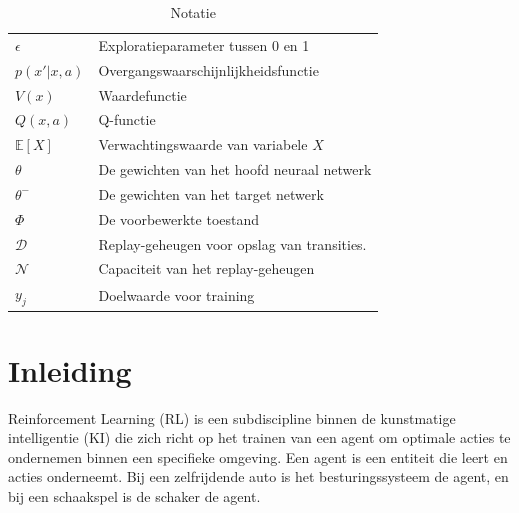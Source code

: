 \documentclass[a4paper,12pt]{report}
\begin{document}
\begin{table}[h]
\begin{tabular}{>{\raggedright}p{2.5cm} >{\raggedright\arraybackslash}p{10cm}}
        $\epsilon$               & Exploratieparameter tussen 0 en 1           \\
        $p(x'|x, a)$             & Overgangswaarschijnlijkheidsfunctie         \\
        $V(x)$                   & Waardefunctie                               \\
        $Q(x, a)$                & Q-functie                                   \\
        $\mathbb{E}[X]$          & Verwachtingswaarde van variabele $X$        \\
        $\theta$                 & De gewichten van het hoofd neuraal netwerk  \\
        $\theta^-$               & De gewichten van het target netwerk         \\
        $\Phi$                   & De voorbewerkte toestand                    \\
        $\mathcal{D}$            & Replay-geheugen voor opslag van transities. \\
        $\mathcal{N}$            & Capaciteit van het replay-geheugen          \\
        $y_j$                    & Doelwaarde voor training                    \\

    \end{tabular}
    \caption{Notatie}
\end{table}

\newpage

\tableofcontents
\newpage
{}  %

\chapter{Inleiding}
Reinforcement Learning (RL) is een subdiscipline binnen de kunstmatige
intelligentie (KI) die zich richt op het trainen van een agent om optimale
acties te ondernemen binnen een specifieke omgeving. Een agent is een entiteit
die leert en acties onderneemt. Bij een zelfrijdende auto is het
besturingssysteem de agent, en bij een schaakspel is de schaker de agent.
\end{document}
